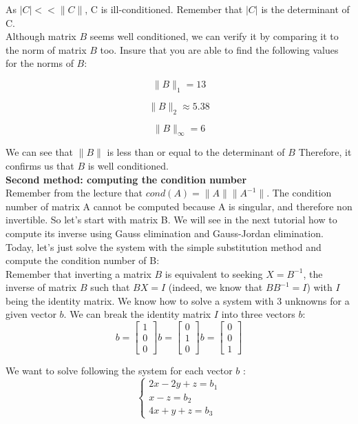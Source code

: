 \documentclass[12pt]{article}
\begin{document}
\hfill \break As $|C| << \| C \|$, C is ill-conditioned. Remember that $|C|$ is the determinant of C. \\

Although matrix $B$ seems well conditioned, we can verify it by comparing it to the norm of matrix $B$ too. Insure that you are able to find the following values for the norms of $B$:

$$\| B \|_1 = 13 $$

$$\| B \|_2 \approx 5.38$$

$$\| B \|_\infty = 6$$

We can see that $\| B \|$ is less than or equal to the determinant of $B$ Therefore, it confirms us that $B$ is well conditioned. \\

\textbf{Second method: computing the condition number} \\

Remember from the lecture that $cond(A)= \| A \| \| A^{-1} \| $. The condition number of matrix A cannot be computed because A is singular, and therefore non invertible. So let's start with matrix B. We will see in the next tutorial how to compute its inverse using Gauss elimination and Gauss-Jordan elimination. Today, let's just solve the system with the simple substitution method and compute the condition number of B: \\

Remember that inverting a matrix $B$ is equivalent to seeking $X = B^{-1}$, the inverse of matrix $B$ such that $BX=I$ (indeed, we know that $ BB^{-1} = I $) with $I$ being the identity matrix. We know how to solve a system with 3 unknowns for a given vector $b$. We can break the identity matrix $I$ into three vectors $b$:\\

$$ b = \begin{bmatrix}
  1 \\
  0 \\
  0
\end{bmatrix} b = \begin{bmatrix}
  0 \\
  1 \\
  0
\end{bmatrix} b = \begin{bmatrix}
  0 \\
  0 \\
  1
\end{bmatrix} $$

We want to solve following the system for each vector $b$ :
$$\begin{cases}
  2x - 2y + z = b_1 \\
  x - z = b_2 \\
  4x + y + z = b_3
\end{cases}$$
\end{document}
